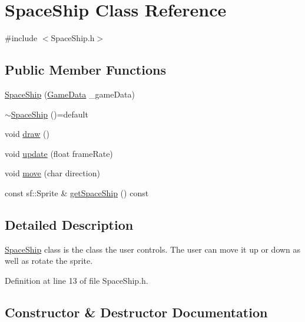 \hypertarget{class_space_ship}{}\section{Space\+Ship Class Reference}
\label{class_space_ship}


{\ttfamily \#include $<$Space\+Ship.\+h$>$}

\subsection*{Public Member Functions}
\begin{DoxyCompactItemize}
\item 
\mbox{\hyperlink{class_space_ship_a64344084d86854f5d08c6a4601e58cf6}{Space\+Ship}} (\mbox{\hyperlink{_engine_8h_a5bbe002e9f7f45a67e8fda9dbe980a3f}{Game\+Data}} \+\_\+game\+Data)
\item 
\mbox{\hyperlink{class_space_ship_a2bf6798a10a1a26ecd0bfbef6bea076d}{$\sim$\+Space\+Ship}} ()=default
\item 
void \mbox{\hyperlink{class_space_ship_aa101a4a70560fe739f6b5d15d5ca9294}{draw}} ()
\item 
void \mbox{\hyperlink{class_space_ship_a9de49446d7a2029f7d05537d2f5d6768}{update}} (float frame\+Rate)
\item 
void \mbox{\hyperlink{class_space_ship_a38ae22af5e0f792b9e26ec257b4bd47a}{move}} (char direction)
\item 
const sf\+::\+Sprite \& \mbox{\hyperlink{class_space_ship_a7529626398ca826b83b19bd06ec0ba2e}{get\+Space\+Ship}} () const
\end{DoxyCompactItemize}


\subsection{Detailed Description}
\mbox{\hyperlink{class_space_ship}{Space\+Ship}} class is the class the user controls. The user can move it up or down as well as rotate the sprite. 

Definition at line 13 of file Space\+Ship.\+h.



\subsection{Constructor \& Destructor Documentation}
\mbox{\label{class_space_ship_a64344084d86854f5d08c6a4601e58cf6}} 
